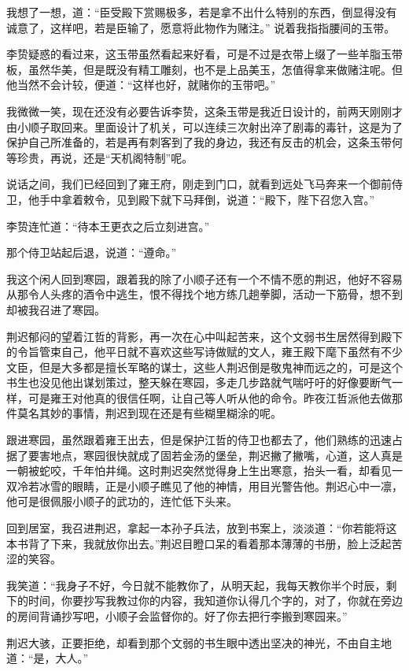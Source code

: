 我想了一想，道：“臣受殿下赏赐极多，若是拿不出什么特别的东西，倒显得没有诚意了，这样吧，若是臣输了，愿意将此物作为赌注。” 说着我指指腰间的玉带。

李贽疑惑的看过来，这玉带虽然看起来好看，可是不过是衣带上缀了一些羊脂玉带板，虽然华美，但是既没有精工雕刻，也不是上品美玉，怎值得拿来做赌注呢。但他当然不会计较，便道：“这样也好，就赌你的玉带吧。”

我微微一笑，现在还没有必要告诉李贽，这条玉带是我近日设计的，前两天刚刚才由小顺子取回来。里面设计了机关，可以连续三次射出淬了剧毒的毒针，这是为了保护自己所准备的，若是再有刺客到了我的身边，我还有反击的机会，这条玉带何等珍贵，再说，还是“天机阁特制”呢。

说话之间，我们已经回到了雍王府，刚走到门口，就看到远处飞马奔来一个御前侍卫，他手中拿着敕令，见到殿下就下马拜倒，说道：“殿下，陛下召您入宫。”

李贽连忙道：“待本王更衣之后立刻进宫。”

那个侍卫站起后退，说道：“遵命。”

我这个闲人回到寒园，跟着我的除了小顺子还有一个不情不愿的荆迟，他好不容易从那令人头疼的酒令中逃生，恨不得找个地方练几趟拳脚，活动一下筋骨，想不到却被我召进了寒园。

荆迟郁闷的望着江哲的背影，再一次在心中叫起苦来，这个文弱书生居然得到殿下的令旨管束自己，他平日就不喜欢这些写诗做赋的文人，雍王殿下麾下虽然有不少文臣，但是大多都是擅长军略的谋士，这些人荆迟倒是敬鬼神而远之的，可是这个书生也没见他出谋划策过，整天躲在寒园，多走几步路就气喘吁吁的好像要断气一样，可是雍王对他真的很信任啊，让自己等人听从他的命令。昨夜江哲派他去做那件莫名其妙的事情，荆迟到现在还是有些糊里糊涂的呢。

跟进寒园，虽然跟着雍王出去，但是保护江哲的侍卫也都去了，他们熟练的迅速占据了要害地点，寒园很快就成了固若金汤的堡垒，荆迟撇了撇嘴，心道，这人真是一朝被蛇咬，千年怕井绳。这时荆迟突然觉得身上生出寒意，抬头一看，却看见一双冷若冰雪的眼睛，正是小顺子瞧见了他的神情，用目光警告他。荆迟心中一凛，他可是很佩服小顺子的武功的，连忙低下头来。

回到居室，我召进荆迟，拿起一本孙子兵法，放到书案上，淡淡道：“你若能将这本书背了下来，我就放你出去。”荆迟目瞪口呆的看着那本薄薄的书册，脸上泛起苦涩的笑容。

我笑道：“我身子不好，今日就不能教你了，从明天起，我每天教你半个时辰，剩下的时间，你要抄写我教过你的内容，我知道你认得几个字的，对了，你就在旁边的房间背诵抄写吧，小顺子会监督你的。好了你去把行李搬到寒园来。”

荆迟大骇，正要拒绝，却看到那个文弱的书生眼中透出坚决的神光，不由自主地道：“是，大人。”

